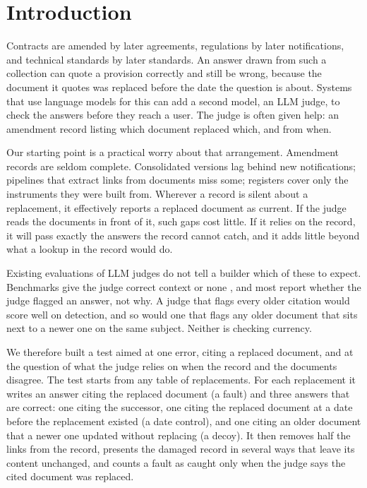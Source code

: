 \section{Introduction}
\label{sec:intro}

Contracts are amended by later agreements, regulations by later notifications, and technical standards by later
standards. An answer drawn from such a collection can quote a provision correctly and still be wrong, because the
document it quotes was replaced before the date the question is about. Systems that use language models
for this can add a second model, an LLM judge, to check the answers before they reach a user. The judge is
often given help: an amendment record listing which document replaced which, and from when.

Our starting point is a practical worry about that arrangement. Amendment records are seldom complete. Consolidated
versions lag behind new notifications; pipelines that extract links from documents miss some; registers cover only the
instruments they were built from. Wherever a record is silent about a replacement, it effectively reports a replaced
document as current. If the judge reads the documents in front of it, such gaps cost little. If it relies on the record,
it will pass exactly the answers the record cannot catch, and it adds little beyond what a lookup in the record would do.

Existing evaluations of LLM judges do not tell a builder which of these to expect. Benchmarks give the judge correct
context or none \citep{tan2025judgebench,xu2025contextualjudgebench}, and most report whether the judge flagged an
answer, not why. A judge that flags every older citation would score well on detection, and so would one that flags
any older document that sits next to a newer one on the same subject. Neither is checking currency.

We therefore built a test aimed at one error, citing a replaced document, and at the question of what the judge relies
on when the record and the documents disagree. The test starts from any table of replacements. For each replacement it
writes an answer citing the replaced document (a fault) and three answers that are correct: one citing the successor,
one citing the replaced document at a date before the replacement existed (a date control), and one citing an older
document that a newer one updated without replacing (a decoy). It then removes half the links from the record, presents
the damaged record in several ways that leave its content unchanged, and counts a fault as caught only when the judge
says the cited document was replaced.

